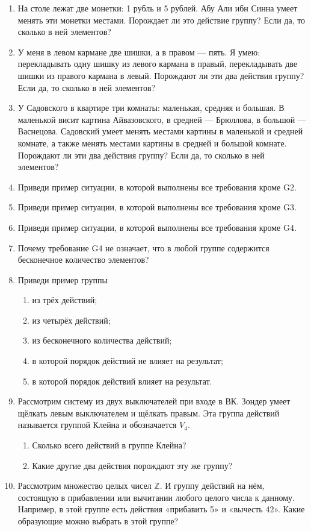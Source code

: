 \documentclass[12pt]{article} %
\begin{document}
\begin{enumerate}
  \item На столе лежат две монетки: 1 рубль и 5 рублей. Абу Али ибн Синна умеет менять эти монетки местами. Порождает ли это действие группу? Если да, то сколько в ней элементов?
  \item У меня в левом кармане две шишки, а в правом — пять. Я умею: перекладывать одну шишку из левого кармана в правый, перекладывать две шишки из правого кармана в левый. Порождают ли эти два действия группу? Если да, то сколько в ней элементов?
  \item У Садовского в квартире три комнаты: маленькая, средняя и большая. В маленькой висит картина Айвазовского, в средней — Брюллова, в большой — Васнецова. Садовский умеет менять местами картины в маленькой и средней комнате, а также менять местами картины в средней и большой комнате. Порождают ли эти два действия группу? Если да, то сколько в ней элементов?
  \item Приведи пример ситуации, в которой выполнены все требования кроме G2.
  \item Приведи пример ситуации, в которой выполнены все требования кроме G3.
  \item Приведи пример ситуации, в которой выполнены все требования кроме G4.
  \item Почему требование G4 не означает, что в любой группе содержится бесконечное количество элементов?
  \item Приведи пример группы
  \begin{enumerate}
    \item из трёх действий;
    \item из четырёх действий;
    \item из бесконечного количества действий;
    \item в которой порядок действий не влияет на результат;
    \item в которой порядок действий влияет на результат.
  \end{enumerate}
  \item Рассмотрим систему из двух выключателей при входе в ВК. Зондер умеет щёлкать левым выключателем и щёлкать правым. Эта группа действий называется группой Клейна и обозначается $V_4$.
  \begin{enumerate}
    \item Сколько всего действий в группе Клейна?
    \item Какие другие два действия порождают эту же группу?
  \end{enumerate}
  \item Рассмотрим множество целых чисел $\mathbb{Z}$. И группу действий на нём, состоящую в прибавлении или вычитании любого целого числа к данному. Например, в этой группе есть действия «прибавить 5» и «вычесть 42». Какие образующие можно выбрать в этой группе?
\end{enumerate}
\end{document}
